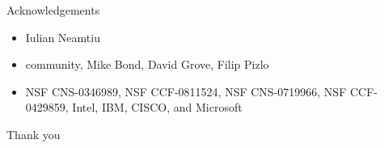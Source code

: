 \begin{frame}{Acknowledgements}%
\begin{itemize}
\item Iulian Neamtiu
\item \JikesRVM{} community, Mike Bond, David Grove, Filip Pizlo
\item NSF CNS-0346989, NSF CCF-0811524, NSF CNS-0719966, NSF CCF-0429859,
Intel, IBM, CISCO, and Microsoft
\end{itemize}
\end{frame}

\begin{frame}{}%
  \begin{center}
    {\Huge Thank you}
  \end{center}
\end{frame}

% 
% 
